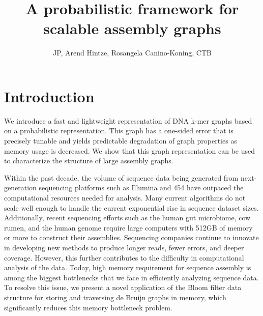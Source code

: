 \documentclass[12pt]{article} \usepackage{simplemargins}
\begin{document}
\title{A probabilistic framework for scalable assembly graphs}
\author{JP, Arend Hintze, Rosangela Canino-Koning, CTB}

\maketitle

\section{Introduction}

We introduce a fast and lightweight representation of DNA k-mer graphs
based on a probabilistic representation.  This graph has a one-sided
error that is precisely tunable and yields predictable degradation of
graph properties as memory usage is decreased.  We show that this
graph representation can be used to characterize the structure of
large assembly graphs.

Within the past decade, the volume of sequence data being generated
from next-generation sequencing platforms such as Illumina and 454
have outpaced the computational resources needed for
analysis. Many current algorithms do not scale well
enough to handle the current exponential rise in sequence dataset
sizes. Additionally, recent sequencing efforts such as the human gut
microbiome\cite{pmid20203603}, cow rumen\cite{pmid21273488}, and the 
human genome\cite{pmid21187386} require large computers with 512GB of memory
or more to construct their
assemblies. Sequencing companies continue to innovate in developing new 
methods to produce longer reads, fewer errors, 
and deeper coverage. However, this further contributes to the difficulty in computational 
analysis of the data. Today, high memory requirement for sequence assembly is
among the biggest bottlenecks that we face in efficiently analyzing
sequence data. To resolve this issue, we present a novel application
of the Bloom filter data structure\cite{bloom} for storing and traversing de
Bruijn graphs in memory, which significantly reduces this
memory bottleneck problem.
\end{document}

